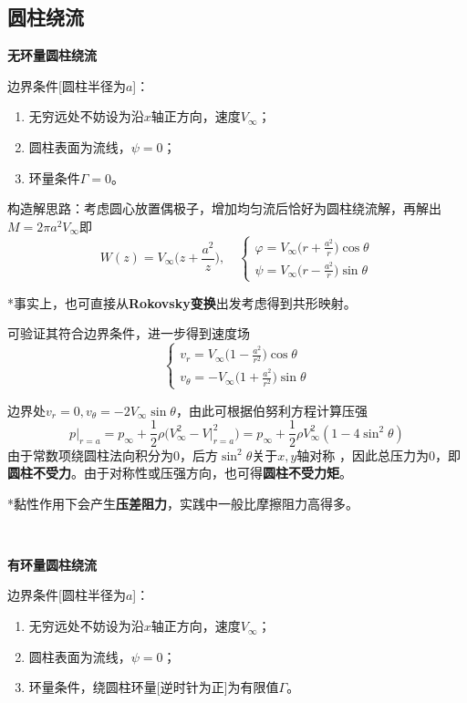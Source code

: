 \documentclass[a4paper,UTF8,fontset=windows]{ctexart}
\begin{document}
\subsection{圆柱绕流}
\textbf{无环量圆柱绕流}

边界条件[圆柱半径为$a$]：
\begin{enumerate}
    \item 无穷远处不妨设为沿$x$轴正方向，速度$V_\infty$；
    \item 圆柱表面为流线，$\psi=0$；
    \item 环量条件$\Gamma=0$。
\end{enumerate}

构造解思路：考虑圆心放置偶极子，增加均匀流后恰好为圆柱绕流解，再解出$M=2\pi a^2V_\infty$即
$$W(z)=V_\infty\bigg(z+\frac{a^2}{z}\bigg),\quad\begin{cases}\varphi=V_\infty\big(r+\frac{a^2}{r}\big)\cos\theta\\\psi=V_\infty\big(r-\frac{a^2}{r}\big)\sin\theta\end{cases}$$

*事实上，也可直接从\textbf{Rokovsky变换}出发考虑得到共形映射。

可验证其符合边界条件，进一步得到速度场
$$\begin{cases}v_r=V_\infty\big(1-\frac{a^2}{r^2}\big)\cos\theta\\v_\theta=-V_\infty\big(1+\frac{a^2}{r^2}\big)\sin\theta\end{cases}$$

边界处$v_r=0,v_\theta=-2V_\infty\sin\theta$，由此可根据伯努利方程计算压强
$$p\big|_{r=a}=p_\infty+\frac{1}{2}\rho\big(V_\infty^2-V|_{r=a}^2\big)=p_\infty+\frac{1}{2}\rho V_\infty^2(1-4\sin^2\theta)$$
由于常数项绕圆柱法向积分为0，后方$\sin^2\theta$关于$x,y$轴对称 ，因此总压力为0，即\textbf{圆柱不受力}。由于对称性或压强方向，也可得\textbf{圆柱不受力矩}。

*黏性作用下会产生\textbf{压差阻力}，实践中一般比摩擦阻力高得多。

\

\textbf{有环量圆柱绕流}

边界条件[圆柱半径为$a$]：
\begin{enumerate}
    \item 无穷远处不妨设为沿$x$轴正方向，速度$V_\infty$；
    \item 圆柱表面为流线，$\psi=0$；
    \item 环量条件，绕圆柱环量[逆时针为正]为有限值$\Gamma$。
\end{enumerate}
\end{document}
